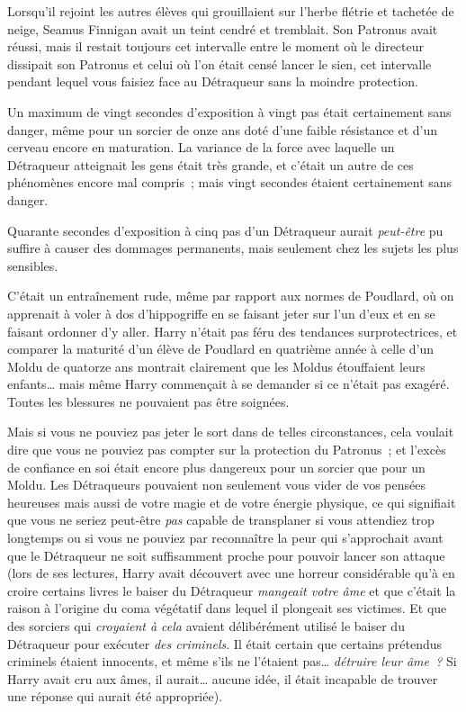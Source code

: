Lorsqu'il rejoint les autres élèves qui grouillaient sur l'herbe flétrie et tachetée de neige, Seamus Finnigan avait un teint cendré et tremblait.
Son Patronus avait réussi, mais il restait toujours cet intervalle entre le moment où le directeur dissipait son Patronus et celui où l'on était censé lancer le sien, cet intervalle pendant lequel vous faisiez face au Détraqueur sans la moindre protection.

Un maximum de vingt secondes d'exposition à vingt pas était certainement sans danger, même pour un sorcier de onze ans doté d'une faible résistance et d'un cerveau encore en maturation.
La variance de la force avec laquelle un Détraqueur atteignait les gens était très grande, et c'était un autre de ces phénomènes encore mal compris~; mais vingt secondes étaient certainement sans danger.

Quarante secondes d'exposition à cinq pas d'un Détraqueur aurait \emph{peut-être} pu suffire à causer des dommages permanents, mais seulement chez les sujets les plus sensibles.

C'était un entraînement rude, même par rapport aux normes de Poudlard, où on apprenait à voler à dos d'hippogriffe en se faisant jeter sur l'un d'eux et en se faisant ordonner d'y aller.
Harry n'était pas féru des tendances surprotectrices, et comparer la maturité d'un élève de Poudlard en quatrième année à celle d'un Moldu de quatorze ans montrait clairement que les Moldus étouffaient leurs enfants… mais même Harry commençait à se demander si ce n'était pas exagéré.
Toutes les blessures ne pouvaient pas être soignées.

Mais si vous ne pouviez pas jeter le sort dans de telles circonstances, cela voulait dire que vous ne pouviez pas compter sur la protection du Patronus~; et l'excès de confiance en soi était encore plus dangereux pour un sorcier que pour un Moldu.
Les Détraqueurs pouvaient non seulement vous vider de vos pensées heureuses mais aussi de votre magie et de votre énergie physique, ce qui signifiait que vous ne seriez peut-être \emph{pas} capable de transplaner si vous attendiez trop longtemps ou si vous ne pouviez par reconnaître la peur qui s'approchait avant que le Détraqueur ne soit suffisamment proche pour pouvoir lancer son attaque (lors de ses lectures, Harry avait découvert avec une horreur considérable qu'à en croire certains livres le baiser du Détraqueur \emph{mangeait votre âme} et que c'était la raison à l'origine du coma végétatif dans lequel il plongeait ses victimes.
Et que des sorciers qui \emph{croyaient à cela} avaient délibérément utilisé le baiser du Détraqueur pour exécuter \emph{des criminels}.
Il était certain que certains prétendus criminels étaient innocents, et même s'ils ne l'étaient pas…
\emph{détruire leur âme~?} Si Harry avait cru aux âmes, il aurait… aucune idée, il était incapable de trouver une réponse qui aurait été appropriée).

